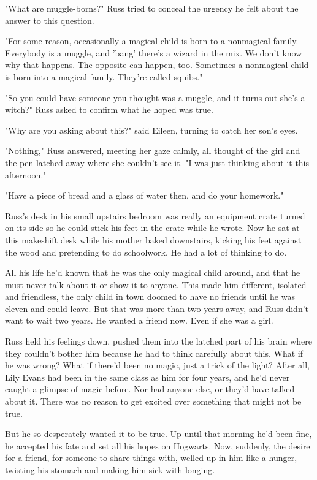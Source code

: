 \documentclass[a4paper,11pt]{article}
\begin{document}
"What are muggle-borns?" Russ tried to conceal the urgency he felt about the answer to this question.

"For some reason, occasionally a magical child is born to a nonmagical family. Everybody is a muggle, and 'bang' there's a wizard in the mix. We don't know why that happens. The opposite can happen, too. Sometimes a nonmagical child is born into a magical family. They're called squibs."

"So you could have someone you thought was a muggle, and it turns out she's a witch?" Russ asked to confirm what he hoped was true.

"Why are you asking about this?" said Eileen, turning to catch her son's eyes.

"Nothing," Russ answered, meeting her gaze calmly, all thought of the girl and the pen latched away where she couldn't see it. "I was just thinking about it this afternoon."

"Have a piece of bread and a glass of water then, and do your homework."

Russ's desk in his small upstairs bedroom was really an equipment crate turned on its side so he could stick his feet in the crate while he wrote. Now he sat at this makeshift desk while his mother baked downstairs, kicking his feet against the wood and pretending to do schoolwork. He had a lot of thinking to do.

All his life he'd known that he was the only magical child around, and that he must never talk about it or show it to anyone. This made him different, isolated and friendless, the only child in town doomed to have no friends until he was eleven and could leave. But that was more than two years away, and Russ didn't want to wait two years. He wanted a friend now. Even if she was a girl.

Russ held his feelings down, pushed them into the latched part of his brain where they couldn't bother him because he had to think carefully about this. What if he was wrong? What if there'd been no magic, just a trick of the light? After all, Lily Evans had been in the same class as him for four years, and he'd never caught a glimpse of magic before. Nor had anyone else, or they'd have talked about it. There was no reason to get excited over something that might not be true.

But he so desperately wanted it to be true. Up until that morning he'd been fine, he accepted his fate and set all his hopes on Hogwarts. Now, suddenly, the desire for a friend, for someone to share things with, welled up in him like a hunger, twisting his stomach and making him sick with longing.
\end{document}
